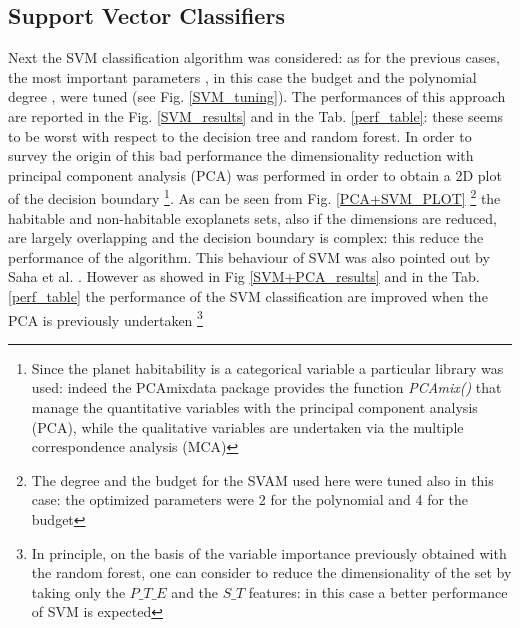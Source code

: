 \documentclass[
12pt, %
a4paper, %
oneside, %
headinclude,footinclude, %
BCOR5mm, %
]{scrartcl}
\begin{document}
\subsection{Support Vector Classifiers}
Next the SVM classification algorithm was considered: as for the previous cases, the most important parameters , in this case the budget and the polynomial degree , were tuned (see Fig. \ref{SVM_tuning}). The performances of this approach are reported in the Fig. \ref{SVM_results} and in the Tab. \ref{perf_table}: these seems to be worst with respect to the decision tree and random forest. In order to survey the origin of this bad performance the dimensionality reduction with principal component analysis (PCA) was performed in order to obtain a 2D plot of the decision boundary \footnote{Since the planet habitability is a categorical variable a particular library was used: indeed the PCAmixdata package provides the function \textit{PCAmix()} that manage the quantitative variables with the principal component analysis (PCA), while the qualitative variables are undertaken via the multiple correspondence analysis (MCA)}. As can be seen from Fig. \ref{PCA+SVM_PLOT} \footnote{The degree and the budget for the SVAM used here  were tuned also in this case: the optimized parameters were 2 for the polynomial and 4 for the budget} the habitable and non-habitable exoplanets sets, also if the dimensions are reduced, are largely overlapping and the decision boundary is complex: this reduce the performance of the algorithm. This behaviour of SVM was also pointed out by Saha et al. \cite{saha2018machine}. However as showed in Fig \ref{SVM+PCA_results} and in the Tab. \ref{perf_table} the performance of the SVM classification are improved when the PCA is previously undertaken \footnote{In principle, on the basis of the variable importance previously obtained with the random forest, one can consider to reduce the dimensionality of the set by taking only the $P\_T\_E$ and the $S\_T$ features: in this case a better performance of SVM is expected}
\end{document}
